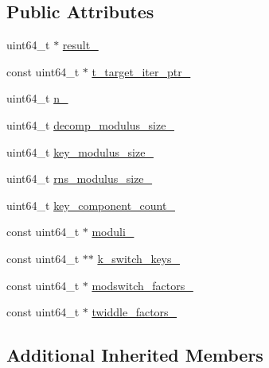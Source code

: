 \subsection*{Public Attributes}
\begin{DoxyCompactItemize}
\item 
uint64\-\_\-t $\ast$ \hyperlink{structintel_1_1hexl_1_1fpga_1_1Object__KeySwitch_a52d7f28512fca04e7d1b3bafecbdccf6}{result\-\_\-}
\item 
const uint64\-\_\-t $\ast$ \hyperlink{structintel_1_1hexl_1_1fpga_1_1Object__KeySwitch_ae31c6cf93ed6fb79ad68a8ae473e5e1d}{t\-\_\-target\-\_\-iter\-\_\-ptr\-\_\-}
\item 
uint64\-\_\-t \hyperlink{structintel_1_1hexl_1_1fpga_1_1Object__KeySwitch_a020885135c3b3f54e574fe0cc8824133}{n\-\_\-}
\item 
uint64\-\_\-t \hyperlink{structintel_1_1hexl_1_1fpga_1_1Object__KeySwitch_aef1b7966f320ffd96aeda0d57bacbeac}{decomp\-\_\-modulus\-\_\-size\-\_\-}
\item 
uint64\-\_\-t \hyperlink{structintel_1_1hexl_1_1fpga_1_1Object__KeySwitch_a3fc107f08b6afabf43eace8ef0f3e30f}{key\-\_\-modulus\-\_\-size\-\_\-}
\item 
uint64\-\_\-t \hyperlink{structintel_1_1hexl_1_1fpga_1_1Object__KeySwitch_a1f2b398daf647ebf2d677a512d9f04a7}{rns\-\_\-modulus\-\_\-size\-\_\-}
\item 
uint64\-\_\-t \hyperlink{structintel_1_1hexl_1_1fpga_1_1Object__KeySwitch_ac7292612ff5f07a4afd5612e422385a3}{key\-\_\-component\-\_\-count\-\_\-}
\item 
const uint64\-\_\-t $\ast$ \hyperlink{structintel_1_1hexl_1_1fpga_1_1Object__KeySwitch_a6452f0b40b3ca377273566ec90f1dc5a}{moduli\-\_\-}
\item 
const uint64\-\_\-t $\ast$$\ast$ \hyperlink{structintel_1_1hexl_1_1fpga_1_1Object__KeySwitch_ad54e0b28e00a46996dd7f0d1da0c9750}{k\-\_\-switch\-\_\-keys\-\_\-}
\item 
const uint64\-\_\-t $\ast$ \hyperlink{structintel_1_1hexl_1_1fpga_1_1Object__KeySwitch_a5be66de56ad9af10b434c22a697b00ad}{modswitch\-\_\-factors\-\_\-}
\item 
const uint64\-\_\-t $\ast$ \hyperlink{structintel_1_1hexl_1_1fpga_1_1Object__KeySwitch_adbd1e4578cfb016b582d0bbefee8fe6f}{twiddle\-\_\-factors\-\_\-}
\end{DoxyCompactItemize}
\subsection*{Additional Inherited Members}


